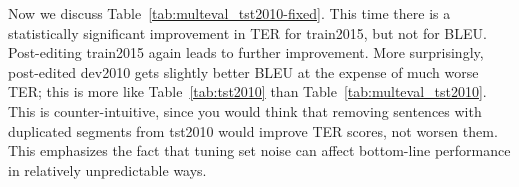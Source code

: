 {\begin{table}[htb]
\caption{\label{tab:multeval_tst2010} %
MultEval results for systems evaluated on the unmodified {\small \tt tst2010} data set.
Official baseline results (with IRSTLM instead of KenLM as discussed previously) are also given for comparison.
} %
\end{table}




\pagebreak
Now we discuss Table~\ref{tab:multeval_tst2010-fixed}.
This time there is a statistically significant improvement in TER for train2015, but not for BLEU.
Post-editing train2015 again leads to further improvement.
More surprisingly, post-edited dev2010 gets slightly better BLEU at the expense of much worse TER; this is more like Table~\ref{tab:tst2010} than Table~\ref{tab:multeval_tst2010}.
This is counter-intuitive, since you would think that removing sentences with duplicated segments from tst2010 would improve TER scores, not worsen them.
This emphasizes the fact that tuning set noise can affect bottom-line performance in relatively unpredictable ways.


}
